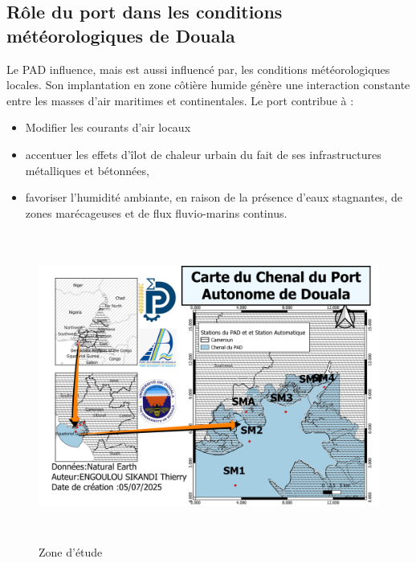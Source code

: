 \documentclass[a4paper,12pt,openany]{report}
\begin{document}
	\subsection{Rôle du port dans les conditions météorologiques de Douala}

\quad Le PAD influence, mais est aussi influencé par, les conditions météorologiques locales. Son implantation en zone côtière humide génère une interaction constante entre les masses d’air maritimes et continentales. Le port contribue à :\\
\begin{itemize}
	\item Modifier les courants d’air locaux 
	\item accentuer les effets d’îlot de chaleur urbain du fait de ses infrastructures métalliques et bétonnées,\\
	\item favoriser l’humidité ambiante, en raison de la présence d’eaux stagnantes, de zones marécageuses et de flux fluvio-marins continus.\\
\end{itemize}
	
	\begin{figure}[H]
		\begin{center}
                \begin{minipage}{\textwidth}
	    	     \begin{center}
	    	      \includegraphics[width=1\textwidth,height=4in]{images/Zone_E_PAD_Vrai.png}
	    	      \end{center}
	    	     \end{minipage}

					\caption{Zone d'étude \label{Fig 2.1} } 
		\end{center}
	\end{figure}
\end{document}
